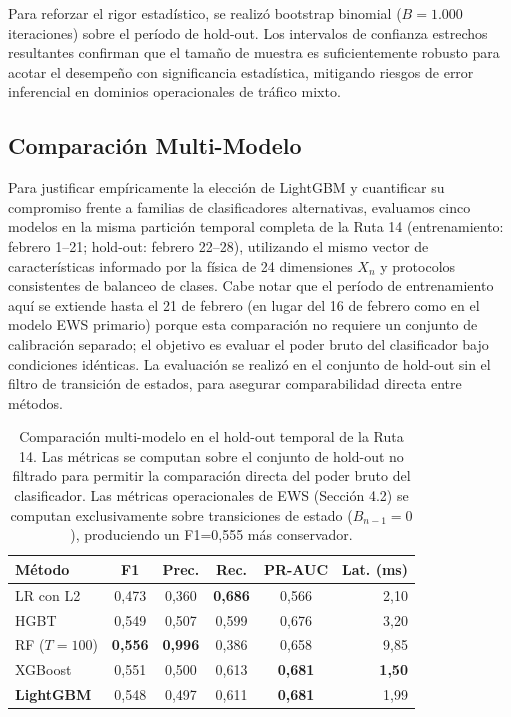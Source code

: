\documentclass[fleqn,10pt,lineno]{wlpeerj}
\begin{document}
Para reforzar el rigor estad\'istico, se realiz\'o bootstrap binomial ($B=1.000$ iteraciones) sobre el per\'iodo de hold-out. Los intervalos de confianza estrechos resultantes confirman que el tama\~no de muestra es suficientemente robusto para acotar el desempe\~no con significancia estad\'istica, mitigando riesgos de error inferencial en dominios operacionales de tr\'afico mixto.

\subsection{Comparaci\'on Multi-Modelo}

Para justificar emp\'iricamente la elecci\'on de LightGBM y cuantificar su compromiso frente a familias de clasificadores alternativas, evaluamos cinco modelos en la misma partici\'on temporal completa de la Ruta 14 (entrenamiento: febrero 1--21; hold-out: febrero 22--28), utilizando el mismo vector de caracter\'isticas informado por la f\'isica de 24 dimensiones $X_n$ y protocolos consistentes de balanceo de clases. Cabe notar que el per\'iodo de entrenamiento aqu\'i se extiende hasta el 21 de febrero (en lugar del 16 de febrero como en el modelo EWS primario) porque esta comparaci\'on no requiere un conjunto de calibraci\'on separado; el objetivo es evaluar el poder bruto del clasificador bajo condiciones id\'enticas. La evaluaci\'on se realiz\'o en el conjunto de hold-out sin el filtro de transici\'on de estados, para asegurar comparabilidad directa entre m\'etodos.

\begin{table}[htbp]
  \caption{Comparaci\'on multi-modelo en el hold-out temporal de la Ruta 14. Las m\'etricas se computan sobre el conjunto de hold-out no filtrado para permitir la comparaci\'on directa del poder bruto del clasificador. Las m\'etricas operacionales de EWS (Secci\'on 4.2) se computan exclusivamente sobre transiciones de estado ($B_{n-1}=0$), produciendo un F1=0,555 m\'as conservador.}
  \centering
  \begin{tabular}{@{}lccccr@{}}
    \toprule
    \textbf{M\'etodo} & \textbf{F1} & \textbf{Prec.} & \textbf{Rec.} & \textbf{PR-AUC} & \textbf{Lat. (ms)} \\ \midrule
    LR con L2        & 0,473 & 0,360 & \textbf{0,686} & 0,566 & 2,10 \\
    HGBT             & 0,549 & 0,507 & 0,599 & 0,676 & 3,20 \\
    RF ($T{=}100$)   & \textbf{0,556} & \textbf{0,996} & 0,386 & 0,658 & 9,85 \\
    XGBoost          & 0,551 & 0,500 & 0,613 & \textbf{0,681} & \textbf{1,50} \\
    \textbf{LightGBM}& 0,548 & 0,497 & 0,611 & \textbf{0,681} & 1,99 \\ \bottomrule
  \end{tabular}
  \label{tab:multimodel}
\end{table}
\end{document}
